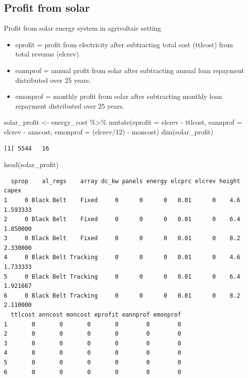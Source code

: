 \documentclass[
  letterpaper,
  DIV=11,
  numbers=noendperiod]{scrartcl}
\newenvironment{Shaded}{\begin{snugshade}}{\end{snugshade}}
\newcommand{\AttributeTok}[1]{\textcolor[rgb]{0.40,0.45,0.13}{#1}}
\newcommand{\DecValTok}[1]{\textcolor[rgb]{0.68,0.00,0.00}{#1}}
\newcommand{\FunctionTok}[1]{\textcolor[rgb]{0.28,0.35,0.67}{#1}}
\newcommand{\NormalTok}[1]{\textcolor[rgb]{0.00,0.23,0.31}{#1}}
\newcommand{\OtherTok}[1]{\textcolor[rgb]{0.00,0.23,0.31}{#1}}
\newcommand{\SpecialCharTok}[1]{\textcolor[rgb]{0.37,0.37,0.37}{#1}}
\providecommand{\tightlist}{%
  \setlength{\itemsep}{0pt}\setlength{\parskip}{0pt}}\usepackage{longtable,booktabs,array}
\begin{document}
\subsection{Profit from solar}\label{profit-from-solar}

Profit from solar energy system in agrivoltaic setting

\begin{itemize}
\tightlist
\item
  eprofit = profit from electricity after subtracting total cost
  (ttlcost) from total revenue (elcrev).
\item
  eannprof = annual profit from solar after subtracting annual loan
  repayment distributed over 25 years.
\item
  emonprof = monthly profit from solar after subtracting monthly loan
  repayment distributed over 25 years.
\end{itemize}

\begin{Shaded}
\begin{Highlighting}[]
\NormalTok{solar\_profit }\OtherTok{\textless{}{-}}\NormalTok{ energy\_cost }\SpecialCharTok{\%\textgreater{}\%}
  \FunctionTok{mutate}\NormalTok{(}\AttributeTok{eprofit =}\NormalTok{ elcrev }\SpecialCharTok{{-}}\NormalTok{ ttlcost,}
         \AttributeTok{eannprof =}\NormalTok{ elcrev }\SpecialCharTok{{-}}\NormalTok{ anncost,}
         \AttributeTok{emonprof =}\NormalTok{ (elcrev}\SpecialCharTok{/}\DecValTok{12}\NormalTok{) }\SpecialCharTok{{-}}\NormalTok{ moncost)}
\FunctionTok{dim}\NormalTok{(solar\_profit)}
\end{Highlighting}
\end{Shaded}

\begin{verbatim}
[1] 5544   16
\end{verbatim}

\begin{Shaded}
\begin{Highlighting}[]
\FunctionTok{head}\NormalTok{(solar\_profit)}
\end{Highlighting}
\end{Shaded}

\begin{verbatim}
  sprop    al_regs    array dc_kw panels energy elcprc elcrev height    capex
1     0 Black Belt    Fixed     0      0      0   0.01      0    4.6 1.593333
2     0 Black Belt    Fixed     0      0      0   0.01      0    6.4 1.850000
3     0 Black Belt    Fixed     0      0      0   0.01      0    8.2 2.330000
4     0 Black Belt Tracking     0      0      0   0.01      0    4.6 1.733333
5     0 Black Belt Tracking     0      0      0   0.01      0    6.4 1.921667
6     0 Black Belt Tracking     0      0      0   0.01      0    8.2 2.110000
  ttlcost anncost moncost eprofit eannprof emonprof
1       0       0       0       0        0        0
2       0       0       0       0        0        0
3       0       0       0       0        0        0
4       0       0       0       0        0        0
5       0       0       0       0        0        0
6       0       0       0       0        0        0
\end{verbatim}
\end{document}
